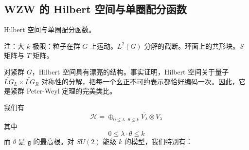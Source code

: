 \subsection{WZW 的 Hilbert 空间与单圈配分函数} %


Hilbert 空间与单圈配分函数。

注：大 $k$ 极限：粒子在群 $G$ 上运动。$L^2(G)$ 分解的截断。环面上的共形块。$S$ 矩阵与 $T$ 矩阵。

对紧群 $G$，Hilbert 空间具有漂亮的结构。事实证明，Hilbert 空间关于量子 $\widetilde{LG}_L\times\widetilde{LG}_R$ 对称性的分解，把每一个幺正不可约表示都恰好编码一次。因此，它是紧群 Peter-Weyl 定理的完美类比。

我们有
\begin{equation}
  \mathcal{H}=\oplus_{0\le\lambda\cdot\theta\le k}\overline{V_{\lambda}}\otimes V_{\lambda}
  \tag{4.180}
  \label{eq:4.180}
\end{equation}
其中
\begin{equation}
  0\le\lambda\cdot\theta\le k
  \tag{4.181}
  \label{eq:4.181}
\end{equation}
而 $\theta$ 是 $\mathfrak{g}$ 的最高根。对 $SU(2)$ 能级 $k$ 的模型，我们特别有：


